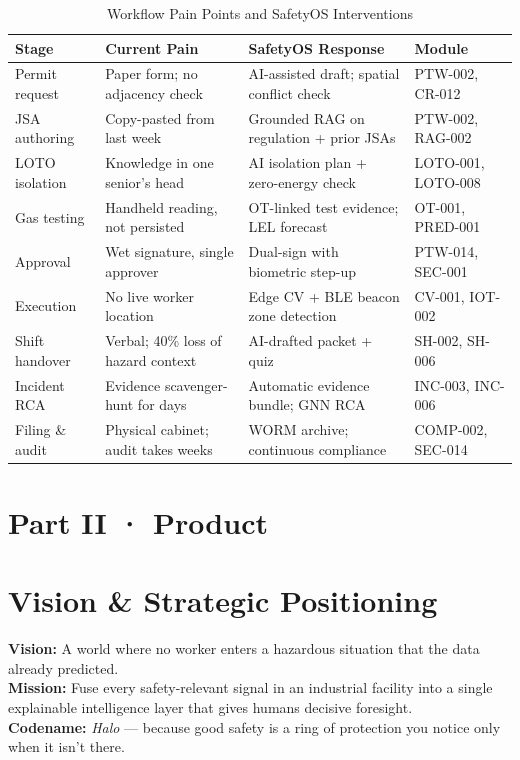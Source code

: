 \documentclass[11pt,a4paper]{article}
\begin{document}
\begin{table}[htbp]
\centering
\caption{Workflow Pain Points and SafetyOS Interventions}
\begin{tabularx}{\textwidth}{
>{\raggedright\arraybackslash}p{}
>{\raggedright\arraybackslash}X
>{\raggedright\arraybackslash}X
>{\centering\arraybackslash}p{}
}
\toprule
\textbf{Stage} & \textbf{Current Pain} & \textbf{SafetyOS Response} & \textbf{Module} \\
\midrule
Permit request & Paper form; no adjacency check & AI-assisted draft; spatial conflict check & PTW-002, CR-012 \\
JSA authoring & Copy-pasted from last week & Grounded RAG on regulation + prior JSAs & PTW-002, RAG-002 \\
LOTO isolation & Knowledge in one senior's head & AI isolation plan + zero-energy check & LOTO-001, LOTO-008 \\
Gas testing & Handheld reading, not persisted & OT-linked test evidence; LEL forecast & OT-001, PRED-001 \\
Approval & Wet signature, single approver & Dual-sign with biometric step-up & PTW-014, SEC-001 \\
Execution & No live worker location & Edge CV + BLE beacon zone detection & CV-001, IOT-002 \\
Shift handover & Verbal; 40\% loss of hazard context & AI-drafted packet + quiz & SH-002, SH-006 \\
Incident RCA & Evidence scavenger-hunt for days & Automatic evidence bundle; GNN RCA & INC-003, INC-006 \\
Filing \& audit & Physical cabinet; audit takes weeks & WORM archive; continuous compliance & COMP-002, SEC-014 \\
\bottomrule
\end{tabularx}
\end{table}

\newpage
\section*{Part II · Product}

\section{Vision \& Strategic Positioning}
\textbf{Vision:} A world where no worker enters a hazardous situation that the data already predicted.\\
\textbf{Mission:} Fuse every safety-relevant signal in an industrial facility into a single explainable intelligence layer that gives humans decisive foresight.\\
\textbf{Codename:} \textit{Halo} — because good safety is a ring of protection you notice only when it isn't there.
\end{document}
